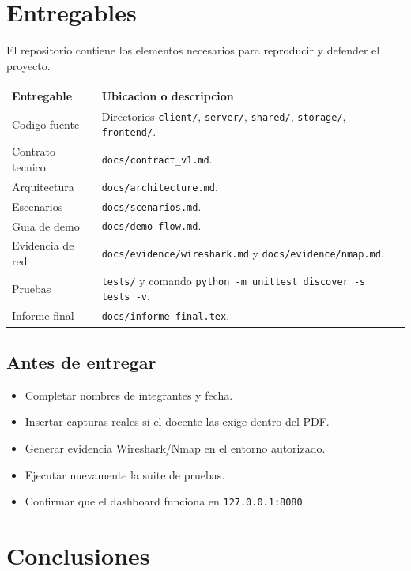 \documentclass[11pt,letterpaper]{article}
\begin{document}
\newpage
\section{Entregables}

El repositorio contiene los elementos necesarios para reproducir y defender el
proyecto.

\begin{longtable}{|p{}|p{}|}
\hline
\textbf{Entregable} & \textbf{Ubicacion o descripcion} \\
\hline
Codigo fuente & Directorios \texttt{client/}, \texttt{server/}, \texttt{shared/}, \texttt{storage/}, \texttt{frontend/}. \\
\hline
Contrato tecnico & \texttt{docs/contract\_v1.md}. \\
\hline
Arquitectura & \texttt{docs/architecture.md}. \\
\hline
Escenarios & \texttt{docs/scenarios.md}. \\
\hline
Guia de demo & \texttt{docs/demo-flow.md}. \\
\hline
Evidencia de red & \texttt{docs/evidence/wireshark.md} y \texttt{docs/evidence/nmap.md}. \\
\hline
Pruebas & \texttt{tests/} y comando \texttt{python -m unittest discover -s tests -v}. \\
\hline
Informe final & \texttt{docs/informe-final.tex}. \\
\hline
\end{longtable}

\subsection{Antes de entregar}

\begin{itemize}
  \item Completar nombres de integrantes y fecha.
  \item Insertar capturas reales si el docente las exige dentro del PDF.
  \item Generar evidencia Wireshark/Nmap en el entorno autorizado.
  \item Ejecutar nuevamente la suite de pruebas.
  \item Confirmar que el dashboard funciona en \texttt{127.0.0.1:8080}.
\end{itemize}

\newpage
\section{Conclusiones}
\end{document}
